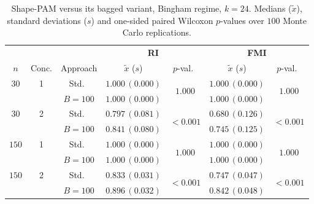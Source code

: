 \documentclass[11pt,a4paper]{article}
\begin{document}
\begin{table}[h]
\centering
\caption{Shape-PAM versus its bagged variant, Bingham regime, $k=24$. Medians ($\tilde x$), standard deviations ($s$) and one-sided paired Wilcoxon $p$-values over $100$ Monte Carlo replications.}
\label{tab:pam-bing-k24}
\footnotesize
\begin{tabular}{cc c cc cc}
\toprule
& & & \multicolumn{2}{c}{\textbf{RI}} & \multicolumn{2}{c}{\textbf{FMI}} \\
\cmidrule(lr){4-5}\cmidrule(lr){6-7}
$n$ & Conc. & Approach & $\tilde x$ ($s$) & $p$-val.\ & $\tilde x$ ($s$) & $p$-val.\ \\
\midrule
$30$ & 1 & Std.\ & $1.000\,(0.000)$ & \multirow{2}{*}{$1.000$} & $1.000\,(0.000)$ & \multirow{2}{*}{$1.000$} \\
     &   & $B{=}100$ & $1.000\,(0.000)$ & & $1.000\,(0.000)$ & \\
$30$ & 2 & Std.\ & $0.797\,(0.081)$ & \multirow{2}{*}{$\mathbf{<\!0.001}$} & $0.680\,(0.126)$ & \multirow{2}{*}{$\mathbf{<\!0.001}$} \\
     &   & $B{=}100$ & $0.841\,(0.080)$ & & $0.745\,(0.125)$ & \\
$150$ & 1 & Std.\ & $1.000\,(0.000)$ & \multirow{2}{*}{$1.000$} & $1.000\,(0.000)$ & \multirow{2}{*}{$1.000$} \\
     &   & $B{=}100$ & $1.000\,(0.000)$ & & $1.000\,(0.000)$ & \\
$150$ & 2 & Std.\ & $0.833\,(0.031)$ & \multirow{2}{*}{$\mathbf{<\!0.001}$} & $0.747\,(0.047)$ & \multirow{2}{*}{$\mathbf{<\!0.001}$} \\
     &   & $B{=}100$ & $0.896\,(0.032)$ & & $0.842\,(0.048)$ & \\
\bottomrule
\end{tabular}
\end{table}
\end{document}
